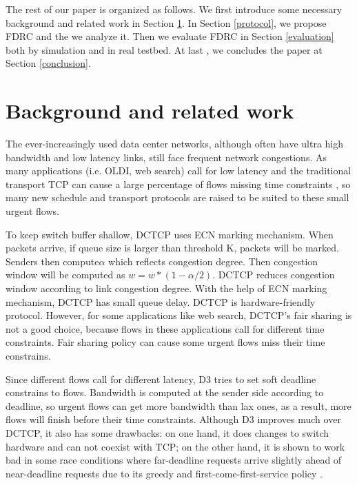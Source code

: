 \documentclass[10pt, conference, letterpaper]{IEEEtran}
\begin{document}
The rest of our paper is organized as follows. 
We first introduce some necessary background and related work in Section \ref{Background}. 
In Section \ref{protocol}, we propose FDRC and the we analyze it. 
Then we evaluate FDRC in Section \ref{evaluation} both by simulation and in real testbed. 
At last , we concludes the paper at Section \ref{conclusion}.




\section{Background and related work} \label{Background}

The ever-increasingly used data center networks, although often have ultra high bandwidth and low latency links, still face frequent network congestions.
As many applications (i.e. OLDI, web search) call for low latency and the traditional transport TCP can cause a large percentage of flows missing time constraints
, so many new schedule and transport protocols are raised to be suited to these small urgent flows.



To keep switch buffer shallow, DCTCP \cite{DCTCP} uses ECN marking mechanism.  
When packets arrive, if queue size is larger than threshold K, packets will be marked. Senders
then compute$\alpha$ which reflects congestion degree.  Then congestion window will be computed as
$w=w*(1-\alpha/2)$. DCTCP reduces congestion window according to link congestion degree. 
With the help of ECN marking mechanism, DCTCP  has small queue delay.
DCTCP is hardware-friendly protocol.
However, for some applications like web search, DCTCP's fair sharing is not a good choice, because flows in these applications
call for different time constraints. Fair sharing policy can cause some urgent flows miss their time constrains.




Since different flows call for different latency, D3 \cite{D3} tries to set soft deadline constrains to flows. Bandwidth is computed at the sender side
according to deadline, so urgent flows can get more bandwidth than lax ones, as a result, more flows will finish before their time constraints.
Although D3 improves much over DCTCP, it also has some drawbacks:
on one hand, it does changes to switch hardware and can not coexist with TCP; 
on the other hand, it is shown to work bad in some race conditions where far-deadline requests arrive slightly ahead of near-deadline requests due to its greedy and first-come-first-service policy \cite{D2TCP}.
\end{document}
